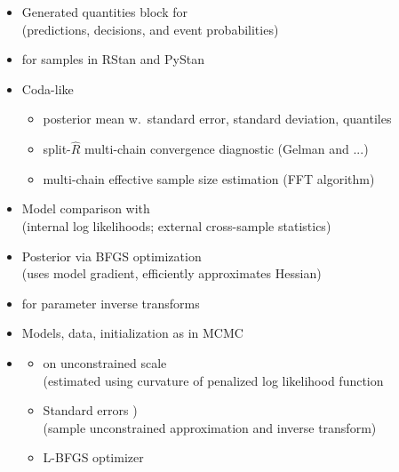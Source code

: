 \documentclass[10pt]{report}
\newcommand{\sld}[1]{\newpage{\noindent\LARGE \ \ \
    \textcolor{MidnightBlue}{\bfseries #1}}\vspace*{4pt}}
\newcommand{\myemph}[1]{{\color{MidnightBlue}{\bfseries #1}}}
\begin{document}
\sld{Posterior Inference}

\begin{itemize}
\item Generated quantities block for \myemph{inference}
  \\ {\footnotesize (predictions, decisions, and event probabilities)}
\item \myemph{Extractors} for samples in RStan and PyStan
\item Coda-like \myemph{posterior summary}
  \vspace*{-4pt}
  \begin{itemize}\small
  \item posterior mean w.\ standard error, standard deviation, quantiles
  \item split-$\hat{R}$ multi-chain convergence diagnostic (Gelman and ...)
  \item multi-chain effective sample size estimation (FFT algorithm)
  \end{itemize}
\item Model comparison with \myemph{WAIC}
  \\
  {\footnotesize (internal log likelihoods; external cross-sample statistics)}
\end{itemize}

\sld{Penalized MLE}

\begin{itemize}
\item Posterior \myemph{mode finding} via BFGS optimization
  \\ {\footnotesize (uses model gradient, efficiently approximates Hessian)}
\item \myemph{Disables Jacobians} for parameter inverse transforms
\item Models, data, initialization as in MCMC
  \vfill
\item \myemph{Very Near Future}
  \vspace*{-4pt}
  \begin{itemize}\small
  \item  \myemph{Standard errors} on unconstrained scale
    \\
    {\footnotesize  (estimated using curvature of penalized log likelihood function}
  \item Standard errors \myemph{on constrained scale})
    \\
    {\footnotesize  (sample unconstrained approximation and inverse transform)}
  \item L-BFGS optimizer
  \end{itemize}      
\end{itemize}
\end{document}
